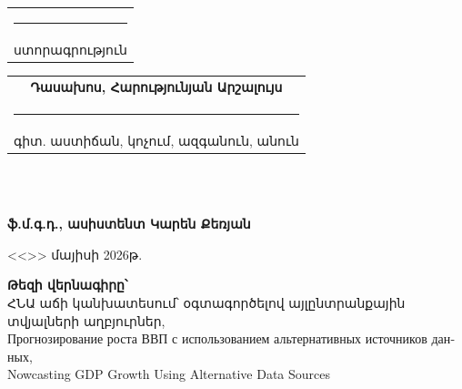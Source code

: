 \documentclass[12pt,a4paper]{report}
\begin{document}
        \hfill
        \begin{tabular}[t]{c}
        \rule{9.0cm}{0.4pt} \\[-0.1cm]
        \footnotesize\textarmenian{ստորագրություն}
        \end{tabular} \vspace{0.8cm}

        \begin{center}
        \begin{tabular}{c}
        {\armenianfrontfont\bfseries Դասախոս, Հարությունյան Արշալույս} \\[-0.1cm]
        \rule{15.0cm}{0.4pt} \\[-0.1cm]
        \footnotesize\textarmenian{գիտ. աստիճան, կոչում, ազգանուն, անուն}
        \end{tabular}
        \end{center} \vspace{1.0cm}

        \vspace{2.2cm}
        \\[1.3cm]

        \\[0.2cm]
        \begin{flushright}
        {\armenianfrontfont\bfseries ֆ.մ.գ.դ., ասիստենտ Կարեն Քեռյան}
        \end{flushright}

        \vfill
        \noindent \textarmenian{<<\hspace{1cm}>> մայիսի 2026թ.}

        \clearpage
        \setcounter{page}{4}
        \vspace*{0.2cm}
        {\armenianfrontfont\bfseries Թեզի վերնագիրը՝}\\[0.75cm]
         \textarmenian{ՀՆԱ աճի կանխատեսում՝ օգտագործելով այլընտրանքային տվյալների աղբյուրներ},\\[0.35cm]
         \textrussian{Прогнозирование роста ВВП с использованием альтернативных источников данных},\\[0.35cm]
         Nowcasting GDP Growth Using Alternative Data Sources\\[1.05cm]
\end{document}
